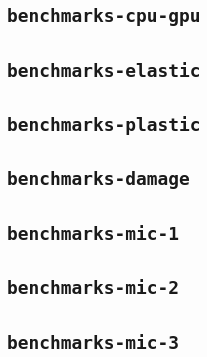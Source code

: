 \subsection{\texttt{benchmarks-cpu-gpu}}
\subsection{\texttt{benchmarks-elastic}}
\subsection{\texttt{benchmarks-plastic}}
\subsection{\texttt{benchmarks-damage}}
\subsection{\texttt{benchmarks-mic-1}}
\subsection{\texttt{benchmarks-mic-2}}
\subsection{\texttt{benchmarks-mic-3}}
